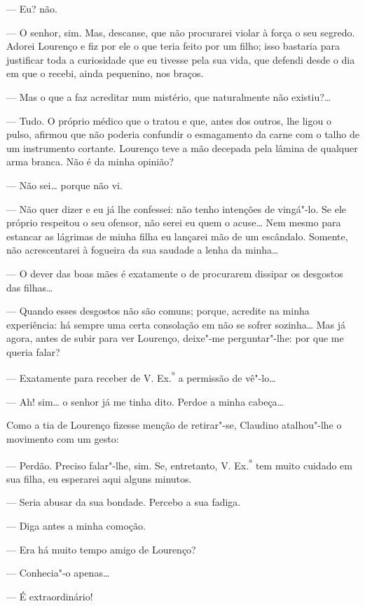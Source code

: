--- Eu? não.

--- O senhor, sim. Mas, descanse, que não procurarei violar à força o
seu segredo. Adorei Lourenço e fiz por ele o que teria feito por um
filho; isso bastaria para justificar toda a curiosidade que eu tivesse
pela sua vida, que defendi desde o dia em que o recebi, ainda pequenino,
nos braços.

--- Mas o que a faz acreditar num mistério, que naturalmente não
existiu?\ldots{}

--- Tudo. O próprio médico que o tratou e que, antes dos outros, lhe
ligou o pulso, afirmou que não poderia confundir o esmagamento da carne
com o talho de um instrumento cortante. Lourenço teve a mão decepada
pela lâmina de qualquer arma branca. Não é da minha opinião?

--- Não sei\ldots{} porque não vi.

--- Não quer dizer e eu já lhe confessei: não tenho intenções de
vingá"-lo. Se ele próprio respeitou o seu ofensor, não serei eu quem o
acuse\ldots{} Nem mesmo para estancar as lágrimas de minha filha eu lançarei
mão de um escândalo. Somente, não acrescentarei à fogueira da sua
saudade a lenha da minha\ldots{}

--- O dever das boas mães é exatamente o de procurarem dissipar os
desgostos das filhas\ldots{}

--- Quando esses desgostos não são comuns; porque, acredite na minha
experiência: há sempre uma certa consolação em não se sofrer sozinha\ldots{}
Mas já agora, antes de subir para ver Lourenço, deixe"-me perguntar"-lhe:
por que me queria falar?

--- Exatamente para receber de V. Ex.\textsuperscript{ª} a permissão de
vê"-lo\ldots{}

--- Ah! sim\ldots{} o senhor já me tinha dito. Perdoe a minha cabeça\ldots{}

Como a tia de Lourenço fizesse menção de retirar"-se, Claudino
atalhou"-lhe o movimento com um gesto:

--- Perdão. Preciso falar"-lhe, sim. Se, entretanto, V.
Ex.\textsuperscript{ª} tem muito cuidado em sua filha, eu esperarei aqui
alguns minutos.

--- Seria abusar da sua bondade. Percebo a sua fadiga.

--- Diga antes a minha comoção.

--- Era há muito tempo amigo de Lourenço?

--- Conhecia"-o apenas\ldots{}

--- É extraordinário!

